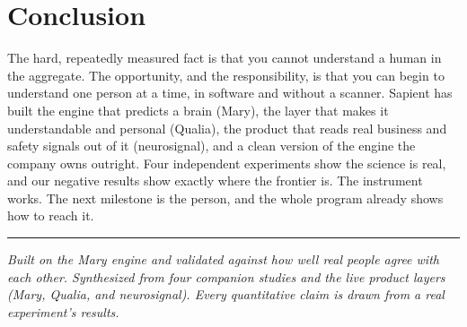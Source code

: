 \documentclass[11pt]{article}
\begin{document}
\section{Conclusion}

The hard, repeatedly measured fact is that you cannot understand a human in the aggregate. The
opportunity, and the responsibility, is that you can begin to understand one person at a time,
in software and without a scanner. Sapient has built the engine that predicts a brain (Mary),
the layer that makes it understandable and personal (Qualia), the product that reads real
business and safety signals out of it (neurosignal), and a clean version of the engine the
company owns outright. Four independent experiments show the science is real, and our negative
results show exactly where the frontier is. The instrument works. The next milestone is the
person, and the whole program already shows how to reach it.

\vspace{0.8em}
\hrule
\vspace{0.6em}
{\footnotesize\color{slate}\itshape
Built on the Mary engine and validated against how well real people agree with each other.
Synthesized from four companion studies and the live product layers (Mary, Qualia, and
neurosignal). Every quantitative claim is drawn from a real experiment's results.}
\end{document}

